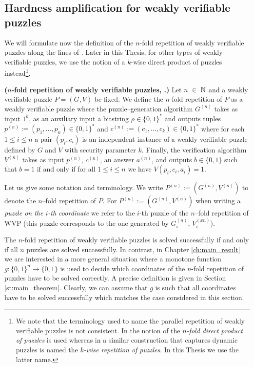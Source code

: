 \subsection{Hardness amplification for weakly verifiable puzzles}
We will formulate now the definition of the $n$-fold repetition of weakly verifiable puzzles along the lines of \cite{canetti2004hardness}.
Later in this Thesis, for other types of weakly verifiable puzzles, we use the notion of a $k$-wise direct product of puzzles instead\footnote{We
note that the terminology used to name the parallel repetition of weakly verifiable puzzles is not consistent.
In \cite{canetti2004hardness} the notion of the \textit{$n$-fold direct product of puzzles} is used whereas in \cite{Dodis:2009:SAI:1530441.1530450}
a similar construction that captures dynamic puzzles is named the \textit{$k$-wise repetition of puzzles}.
In this Thesis we use the latter name.}.
%
\begin{definition}\textbf{($n$-fold repetition of weakly verifiable puzzles, \cite{canetti2004hardness}.)}
  \label{def:n-fold-rep}
  Let $n~\in~\mathbb{N}$ and a weakly verifiable puzzle $P = (G,V)$ be fixed.
  We define the $n$-fold repetition of $P$ as a weakly verifiable puzzle where the puzzle--generation algorithm
  $G^{(n)}$ takes as input $1^k$, as an auxiliary input a bitstring $\rho \in \{0,1\}^{*}$
  and outputs tuples $p^{(n)} := (p_1, \dotsc, p_n) \in \{0,1\}^{*}$ and $c^{(n)} := (c_1, \dotsc, c_k) \in \{0,1\}^{*}$
  where for each $1 \leq i \leq n$ a pair $(p_i, c_i)$ is an independent instance of a weakly verifiable puzzle defined by $G$ and $V$ with security parameter $k$.
  Finally, the verification algorithm $V^{(n)}$ takes as input $p^{(n)}$, $c^{(n)}$, an answer $a^{(n)}$, and outputs $b \in \{0,1\}$
  such that $b = 1$ if and only if for all $1 \leq i \leq n$ we have $V(p_i, c_i, a_i) = 1$.
 \end{definition}
%
Let us give some notation and terminology. We write $P^{(n)} := (G^{(n)}, V^{(n)})$ to denote the $n$--fold repetition of $P$.
For $P^{(n) } := (G^{(n)},V^{(n)})$ when writing a \textit{puzzle on the $i$-th coordinate} we refer to the $i$-th puzzle of the $n$--fold repetition of WVP
(this puzzle corresponds to the one generated by $G^{(n)}_i$,  $V^{(xn)}_i$).

The $n$-fold repetition of weakly verifiable puzzles is solved successfully if and only if all $n$ puzzles are solved successfully.
In contrast, in Chapter \ref{ch:main_result} we are interested in a more general situation where a monotone function $g: \{0,1\}^{n} \rightarrow \{0,1\}$ is used to decide
which coordinates of the $n$-fold repetition of puzzles have to be solved correctly. A precise definition is given in Section \ref{st:main_theorem}.
Clearly, we can assume that $g$ is such that all coordinates have to be solved successfully which matches the case considered in this section.

